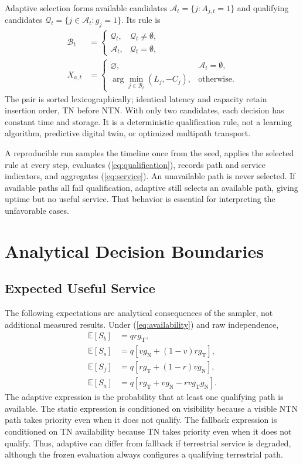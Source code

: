 \documentclass[10pt,twocolumn]{article}
\newcommand{\TN}{\mathrm{T}}
\newcommand{\NTN}{\mathrm{N}}
\begin{document}
Adaptive selection forms available candidates $\mathcal A_t=\{j:A_{j,t}=1\}$ and qualifying candidates $\mathcal Q_t=\{j\in\mathcal A_t:g_j=1\}$. Its rule is
\begin{align}
 \mathcal B_t&=\begin{cases}\mathcal Q_t,&\mathcal Q_t\ne\emptyset,\\\mathcal A_t,&\mathcal Q_t=\emptyset,\end{cases}\\
 X_{a,t}&=\begin{cases}
 \varnothing,&\mathcal A_t=\emptyset,\\
 \arg\min_{j\in\mathcal B_t}(L_j,-C_j),&\text{otherwise}.
 \end{cases}
\end{align}
The pair is sorted lexicographically; identical latency and capacity retain insertion order, TN before NTN. With only two candidates, each decision has constant time and storage. It is a deterministic qualification rule, not a learning algorithm, predictive digital twin, or optimized multipath transport.

A reproducible run samples the timeline once from the seed, applies the selected rule at every step, evaluates (\ref{eq:qualification}), records path and service indicators, and aggregates (\ref{eq:service}). An unavailable path is never selected. If available paths all fail qualification, adaptive still selects an available path, giving uptime but no useful service. That behavior is essential for interpreting the unfavorable cases.

\section{Analytical Decision Boundaries}
\subsection{Expected Useful Service}
The following expectations are analytical consequences of the sampler, not additional measured results. Under (\ref{eq:availability}) and raw independence,
\begin{align}
 \mathbb E[S_b]&=qrg_\TN,\label{eq:baseline}\\
 \mathbb E[S_s]&=q\left[vg_\NTN+(1-v)rg_\TN\right],\\
 \mathbb E[S_f]&=q\left[rg_\TN+(1-r)vg_\NTN\right],\\
 \mathbb E[S_a]&=q\left[rg_\TN+vg_\NTN-rvg_\TN g_\NTN\right].\label{eq:adaptive}
\end{align}
The adaptive expression is the probability that at least one qualifying path is available. The static expression is conditioned on visibility because a visible NTN path takes priority even when it does not qualify. The fallback expression is conditioned on TN availability because TN takes priority even when it does not qualify. Thus, adaptive can differ from fallback if terrestrial service is degraded, although the frozen evaluation always configures a qualifying terrestrial path.
\end{document}
